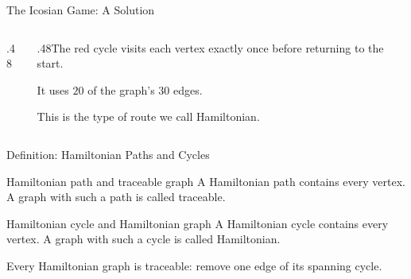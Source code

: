 \documentclass[aspectratio=169,11pt]{beamer}
\begin{document}
\begin{frame}{The Icosian Game: A Solution}
\begin{columns}[c,onlytextwidth]
\begin{column}{.48\textwidth}
\begin{center}
\end{center}\end{column}\begin{column}{.48\textwidth}The red cycle visits each vertex exactly once before returning to the start.\par\medskip It uses $20$ of the graph's $30$ edges.\par\medskip This is the type of route we call Hamiltonian.\end{column}\end{columns}
\end{frame}

\begin{frame}{Definition: Hamiltonian Paths and Cycles}
\large
\begin{block}{Hamiltonian path and traceable graph}
A Hamiltonian path contains every vertex. A graph with such a path is called traceable.
\end{block}
\begin{block}{Hamiltonian cycle and Hamiltonian graph}
A Hamiltonian cycle contains every vertex. A graph with such a cycle is called Hamiltonian.
\end{block}
\medskip Every Hamiltonian graph is traceable: remove one edge of its spanning cycle.
\end{frame}
\end{document}
